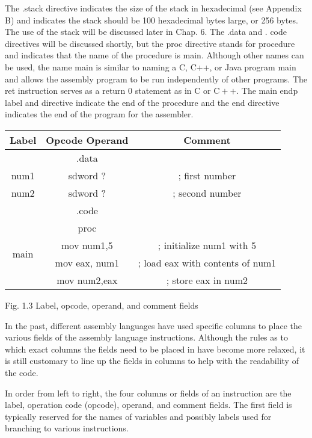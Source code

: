 \documentclass[10pt]{article}
\begin{document}
The .stack directive indicates the size of the stack in hexadecimal (see Appendix B) and indicates the stack should be 100 hexadecimal bytes large, or 256 bytes. The use of the stack will be discussed later in Chap. 6. The .data and . code directives will be discussed shortly, but the proc directive stands for procedure and indicates that the name of the procedure is main. Although other names can be used, the name main is similar to naming a C, C++, or Java program main and allows the assembly program to be run independently of other programs. The ret instruction serves as a return 0 statement as in C or $\mathrm{C}++$. The main endp label and directive indicate the end of the procedure and the end directive indicates the end of the program for the assembler.

\begin{center}
\begin{tabular}{|c|c|c|}
\hline
Label & Opcode Operand & Comment \\
\hline
 & .data &  \\
\hline
num1 & sdword ? & ; first number \\
\hline
num2 & sdword ? & ; second number \\
\hline
 & .code &  \\
\hline
\multirow[t]{4}{*}{main} & proc &  \\
\hline
 & mov num1,5 & ; initialize num1 with 5 \\
\hline
 & mov eax, num1 & ; load eax with contents of num1 \\
\hline
 & mov num2,eax & ; store eax in num2 \\
\hline
\end{tabular}
\end{center}

Fig. 1.3 Label, opcode, operand, and comment fields

In the past, different assembly languages have used specific columns to place the various fields of the assembly language instructions. Although the rules as to which exact columns the fields need to be placed in have become more relaxed, it is still customary to line up the fields in columns to help with the readability of the code.

In order from left to right, the four columns or fields of an instruction are the label, operation code (opcode), operand, and comment fields. The first field is typically reserved for the names of variables and possibly labels used for branching to various instructions.
\end{document}
